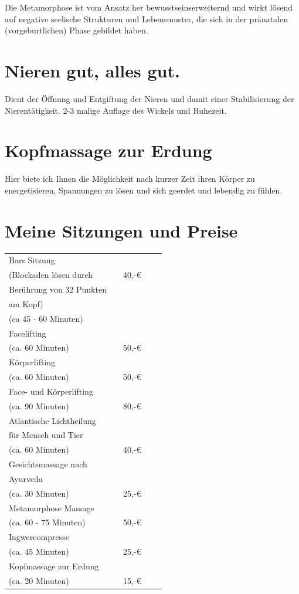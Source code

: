 \documentclass[foldmark,10pt,a4paper,notumble]{leaflet}
\begin{document}
Die Metamorphose ist vom Ansatz her bewusstseins\-erweiternd und wirkt lösend auf negative seelische Strukturen und Lebensmuster, die sich in der pränatalen (vorgeburtlichen) Phase gebildet haben.

\section{Nieren gut, alles gut. }
Dient der Öffnung und Entgiftung der Nieren und damit einer Stabilisierung der Nierentätigkeit. 2-3 malige Auflage des Wickels und Ruhezeit. 

\section{Kopfmassage zur Erdung}
Hier biete ich Ihnen die Möglichkeit nach kurzer Zeit ihren Körper zu energetisieren, Spannungen zu lösen und sich geerdet und lebendig zu fühlen. 


\section{Meine Sitzungen und Preise}

 \begin{tabular}{p{40mm}llcc}\hline\hline
Bars Sitzung              &     &  \\
(Blockaden lösen durch & & 40,-€ \\
Berührung von 32 Punkten & & \\
am Kopf) & & \\
(ca 45 - 60 Minuten)  &   &  \\
\hline
Facelifting   &   &  \\
(ca. 60 Minuten) & & 50,-€\\
\hline
Körperlifting   &   &  \\
(ca. 60 Minuten) & & 50,-€\\
\hline
Face- und Körperlifting   &   &  \\
(ca. 90 Minuten) & & 80,-€\\
 \hline
Atlantische Lichtheilung   &   &  \\
für Mensch und Tier & & \\
(ca. 60 Minuten) & & 40,-€ \\
\hline
Gesichtsmassage nach  &   &  \\
Ayurveda & & \\
(ca. 30 Minuten) & & 25,-€ \\
\hline
Metamorphose Massage  &   &  \\
(ca. 60 - 75 Minuten) & & 50,-€ \\
\hline
Ingwercompresse  &   &  \\
(ca. 45 Minuten) & & 25,-€ \\
\hline
Kopfmassage zur Erdung  &   &  \\
(ca. 20 Minuten) & & 15,-€ \\
\hline
\end{tabular}
\end{document}

